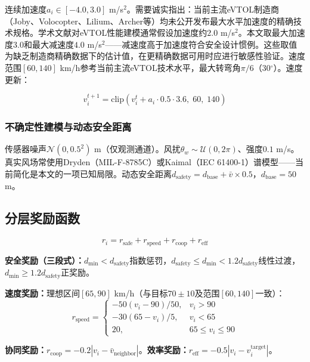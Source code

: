 \documentclass[12pt,a4paper,UTF8]{ctexart}
\begin{document}
连续加速度$a_i \in [-4.0, 3.0]$ m/s$^2$。需要诚实指出：当前主流eVTOL制造商（Joby、Volocopter、Lilium、Archer等）均未公开发布最大水平加速度的精确技术规格。学术文献对eVTOL性能建模通常假设加速度约$2.0$ m/s$^2$\cite{ref25}。本文取最大加速度$3.0$和最大减速度$4.0$ m/s$^2$——减速度高于加速度符合安全设计惯例。这些取值为缺乏制造商精确数据下的估计值，在更精确数据可用时应进行敏感性验证。速度范围$[60, 140]$ km/h参考当前主流eVTOL技术水平，最大转弯角$\pi/6$（30$^\circ$）。速度更新：

\begin{equation}
    v_i^{t+1} = \text{clip}\!\left(v_i^{t} + a_i \cdot 0.5 \cdot 3.6,\; 60,\; 140\right)
\end{equation}

\subsubsection{不确定性建模与动态安全距离}

传感器噪声$\mathcal{N}(0, 0.5^2)$ m（仅观测通道）。风扰$\theta_w \sim \mathcal{U}(0, 2\pi)$、强度$0.1$ m/s。真实风场常使用Dryden（MIL-F-8785C）\cite{ref26}或Kaimal（IEC 61400-1）谱模型——当前简化是本文的一项已知局限。动态安全距离$d_{\text{safety}} = d_{\text{base}} + \bar{v} \times 0.5$，$d_{\text{base}}=50$ m。

\subsection{分层奖励函数}

\begin{equation}
    r_i = r_{\text{safe}} + r_{\text{speed}} + r_{\text{coop}} + r_{\text{eff}}
\end{equation}

\textbf{安全奖励（三段式）：}$d_{\min}<d_{\text{safety}}$指数惩罚，$d_{\text{safety}}\leq d_{\min}<1.2d_{\text{safety}}$线性过渡，$d_{\min}\geq 1.2d_{\text{safety}}$正奖励。

\textbf{速度奖励：}理想区间$[65,90]$ km/h（与目标$70\pm10$及范围$[60,140]$一致）：
\begin{equation}
    r_{\text{speed}} = \begin{cases}
        -50(v_i-90)/50, & v_i>90 \\
        -30(65-v_i)/5, & v_i<65 \\
        20, & 65\leq v_i\leq 90
    \end{cases}
\end{equation}

\textbf{协同奖励：}$r_{\text{coop}}=-0.2|v_i-\bar{v}_{\text{neighbor}}|$。\textbf{效率奖励：}$r_{\text{eff}}=-0.5|v_i-v_i^{\text{target}}|$。
\end{document}
